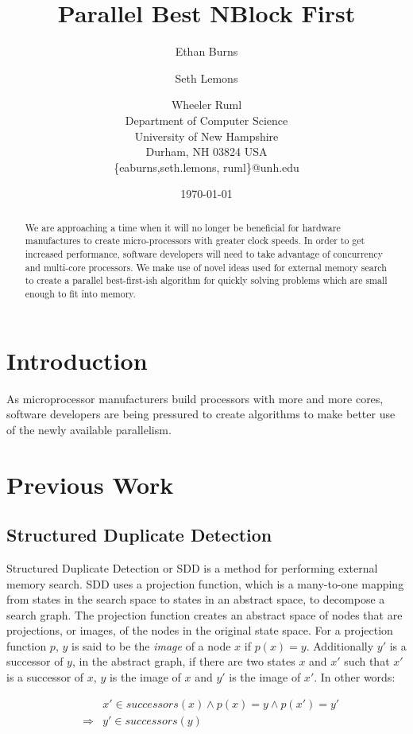 \documentclass{article} \usepackage{aaai} \usepackage{graphicx}
\title{Parallel Best NBlock First}
\author{Ethan Burns \and Seth Lemons \and Wheeler Ruml \\
Department of Computer Science \\
University of New Hampshire \\
Durham, NH 03824 USA \\
\{eaburns,seth.lemons, ruml\}@unh.edu}
\date{\today}
\begin{document}
\maketitle

\begin{abstract}
We are approaching a time when it will no longer be beneficial for
hardware manufactures to create micro-processors with greater clock
speeds.  In order to get increased performance, software developers
will need to take advantage of concurrency and multi-core processors.
We make use of novel ideas used for external memory search to create a
parallel best-first-ish algorithm for quickly solving problems which
are small enough to fit into memory.
\end{abstract}

\section{Introduction}

As microprocessor manufacturers build processors with more and more
cores, software developers are being pressured to create algorithms to
make better use of the newly available parallelism.

\section{Previous Work}

\subsection{Structured Duplicate Detection}

Structured Duplicate Detection or SDD \cite{zhou:sdd} is a method for
performing external memory search.  SDD uses a projection function,
which is a many-to-one mapping from states in the search space to
states in an abstract space, to decompose a search graph.  The
projection function creates an abstract space of nodes that are
projections, or images, of the nodes in the original state space.  For
a projection function $p$, $y$ is said to be the \emph{image} of a
node $x$ if $p(x) = y$.  Additionally $y'$ is a successor of $y$, in
the abstract graph, if there are two states $x$ and $x'$ such that
$x'$ is a successor of $x$, $y$ is the image of $x$ and $y'$ is the
image of $x'$.  In other words:

\begin{eqnarray*}
&&x' \in successors(x) \wedge p(x) = y \wedge p(x') = y' \\
&\Rightarrow& y' \in successors(y)
\end{eqnarray*}
\end{document}
